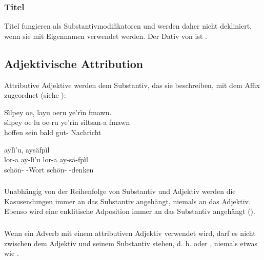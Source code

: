 \subsubsection{Titel} Titel fungieren als Substantivmodifikatoren und werden daher nicht dekliniert, wenn sie mit Eigennamen verwendet werden. Der Dativ von   ist . 

\subsection{Adjektivische Attribution} Attributive Adjektive werden dem Substantiv, das sie beschreiben, mit dem Affix  zugeordnet (siehe ):

\begin{interlin}
	\glll \Npawl{}Sìlpey oe, layu oeru ye'rìn  fmawn. \\
	sìlpey oe lu oe-ru ye'rìn sìltsan-a fmawn \\
	hoffen  sein  bald gut- Nachricht \\
\end{interlin}

\begin{interlin}
	\glll \Npawl{} aylì'u,  aysäfpìl \\
	lor-a ay-lì'u lor-a ay-sä-fpìl \\
	schön- -Wort schön- -denken \\
\end{interlin}
\label{syn:adj:attr}

\subsubsection{} Unabhängig von der Reihenfolge von Substantiv und Adjektiv werden die Kasusendungen immer an das Substantiv angehängt, niemals an das Adjektiv. Ebenso wird eine enklitische Adposition immer an das Substantiv angehängt
().

\subsubsection{} Wenn ein Adverb mit einem attributiven Adjektiv verwendet wird, darf es nicht zwischen dem Adjektiv und seinem Substantiv stehen, d. h.   oder , niemals etwas wie .


